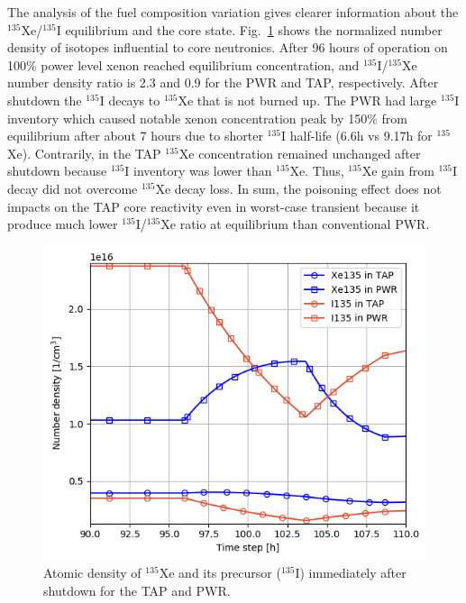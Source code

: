 \documentclass{anstrans}
\begin{document}
The analysis of the fuel composition variation gives
clearer information about 
the $^{135}$Xe/$^{135}$I equilibrium and the core state. Fig.~\ref{fig:compos} 
shows the normalized number density of isotopes influential
to core 
neutronics. After 96 hours of operation on 100\% power level xenon reached 
equilibrium concentration, and $^{135}$I/$^{135}$Xe number density ratio is 
2.3 and 0.9 for the \gls{PWR} and \gls{TAP}, respectively. After shutdown the 
$^{135}$I decays to $^{135}$Xe that is not burned up. The \gls{PWR} had large 
$^{135}$I inventory which caused notable xenon concentration peak by 150\% 
from equilibrium after about 7 hours due to shorter $^{135}$I half-life (6.6h 
vs 9.17h for $^{135}$Xe). Contrarily, in the \gls{TAP} $^{135}$Xe 
concentration remained unchanged after shutdown because $^{135}$I inventory 
was lower than $^{135}$Xe. Thus, $^{135}$Xe gain from $^{135}$I decay did not 
overcome $^{135}$Xe decay loss. In sum, the poisoning effect does not impacts 
on the \gls{TAP} core reactivity even in worst-case transient because it 
produce much lower $^{135}$I/$^{135}$Xe ratio at equilibrium than 
conventional \gls{PWR}.
\begin{figure}[htbp!] %
        \centering
        \includegraphics[width=1.07\linewidth]{tap_vs_pwr_xe_i_density.png}
        \caption{Atomic density of $^{135}$Xe and its precursor ($^{135}$I) 
        immediately after shutdown for the \gls{TAP} and \gls{PWR}.}
        \label{fig:compos}
\end{figure}
\end{document}
